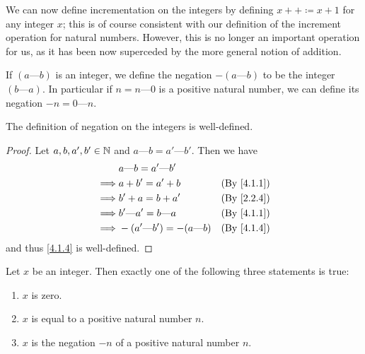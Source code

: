 \begin{note}
  We can now define incrementation on the integers by defining \(x++ \coloneqq x + 1\) for any integer \(x\);
  this is of course consistent with our definition of the increment operation for natural numbers.
  However, this is no longer an important operation for us, as it has been now superceded by the more general notion of addition.
\end{note}

\begin{defn}\label{4.1.4}
  If \((a \text{---} b)\) is an integer, we define the negation \(-(a \text{---} b)\) to be the integer \((b \text{---} a)\).
  In particular if \(n = n \text{---} 0\) is a positive natural number, we can define its negation \(-n = 0 \text{---} n\).
\end{defn}

\begin{ac}\label{ac:4.1.2}
  The definition of negation on the integers is well-defined.
\end{ac}

\begin{proof}
  Let \(a, b, a', b' \in \mathbb{N}\) and \(a \text{---} b = a' \text{---} b'\).
  Then we have
  \begin{align*}
             & a \text{---} b = a' \text{---} b'                                  \\
    \implies & a + b' = a' + b                         & \text{(By \cref{4.1.1})} \\
    \implies & b' + a = b + a'                         & \text{(By \cref{2.2.4})} \\
    \implies & b' \text{---} a' = b \text{---} a       & \text{(By \cref{4.1.1})} \\
    \implies & -(a' \text{---} b') = -(a \text{---} b) & \text{(By \cref{4.1.4})} \\
  \end{align*}
  and thus \cref{4.1.4} is well-defined.
\end{proof}

\begin{lem}\label{4.1.5}
  Let \(x\) be an integer.
  Then exactly one of the following three statements is true:
  \begin{enumerate}
    \item \(x\) is zero.
    \item \(x\) is equal to a positive natural number \(n\).
    \item \(x\) is the negation \(-n\) of a positive natural number \(n\).
  \end{enumerate}
\end{lem}

